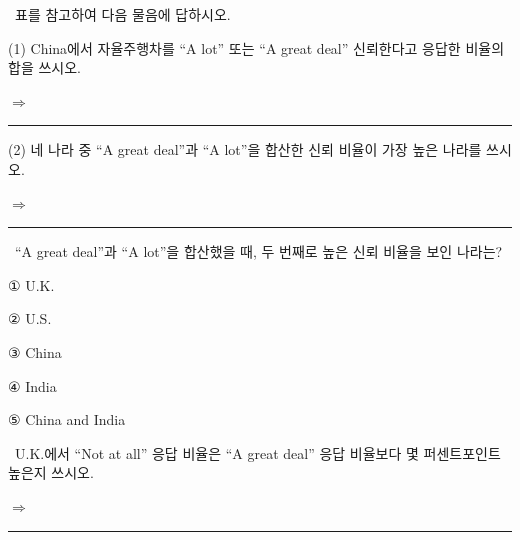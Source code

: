 \documentclass[11pt,a4paper]{article}
\newcommand{\qno}[1]{\par\vspace{8pt}\noindent{\sffamily\bfseries #1.}\ }
\newcommand{\instr}[1]{{\sffamily #1}\par\vspace{3pt}}
\begin{document}
\vspace{14pt}

\qno{2}\instr{[서술형] 표를 참고하여 다음 물음에 답하시오.}

\noindent (1) China에서 자율주행차를 ``A lot'' 또는 ``A great deal'' 신뢰한다고 응답한 비율의 합을 쓰시오.

\noindent $\Rightarrow$ \rule{4cm}{0.4pt}

\vspace{10pt}

\noindent (2) 네 나라 중 ``A great deal''과 ``A lot''을 합산한 신뢰 비율이 가장 높은 나라를 쓰시오.

\noindent $\Rightarrow$ \rule{4cm}{0.4pt}

\qno{3}\instr{``A great deal''과 ``A lot''을 합산했을 때, 두 번째로 높은 신뢰 비율을 보인 나라는?}
\begin{choices}
\item ① U.K.
\item ② U.S.
\item ③ China
\item ④ India
\item ⑤ China and India
\end{choices}

\qno{4}\instr{[서술형] U.K.에서 ``Not at all'' 응답 비율은 ``A great deal'' 응답 비율보다 몇 퍼센트포인트 높은지 쓰시오.}
\par\vspace{4pt}\noindent
$\Rightarrow$ \rule{4cm}{0.4pt}
\end{document}
